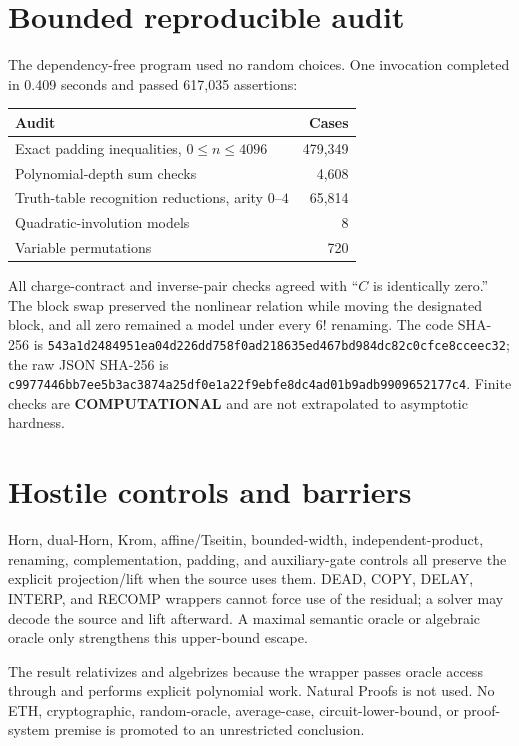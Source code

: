 \documentclass[11pt]{article}
\newcommand{\COMP}{\textbf{COMPUTATIONAL}}
\begin{document}
\section{Bounded reproducible audit}
The dependency-free program
 used no random
choices.  One invocation completed in 0.409 seconds and passed 617,035
assertions:
\begin{center}
\begin{tabular}{lr}
\toprule
Audit & Cases \\
\midrule
Exact padding inequalities, $0\le n\le4096$ & 479,349 \\
Polynomial-depth sum checks & 4,608 \\
Truth-table recognition reductions, arity $0$--$4$ & 65,814 \\
Quadratic-involution models & 8 \\
Variable permutations & 720 \\
\bottomrule
\end{tabular}
\end{center}
All charge-contract and inverse-pair checks agreed with ``$C$ is identically
zero.''  The block swap preserved the nonlinear relation while moving the
designated block, and all zero remained a model under every $6!$ renaming.
The code SHA-256 is
\texttt{543a1d2484951ea04d226dd758f0ad218635ed467bd984dc82c0cfce8cceec32};
the raw JSON SHA-256 is
\texttt{c9977446bb7ee5b3ac3874a25df0e1a22f9ebfe8dc4ad01b9adb9909652177c4}.
Finite checks are \COMP{} and are not extrapolated to asymptotic hardness.

\section{Hostile controls and barriers}
Horn, dual-Horn, Krom, affine/Tseitin, bounded-width, independent-product,
renaming, complementation, padding, and auxiliary-gate controls all preserve
the explicit projection/lift when the source uses them.  DEAD, COPY, DELAY,
INTERP, and RECOMP wrappers cannot force use of the residual; a solver may
decode the source and lift afterward.  A maximal semantic oracle or algebraic
oracle only strengthens this upper-bound escape.

The result relativizes and algebrizes because the wrapper passes oracle access
through and performs explicit polynomial work.  Natural Proofs is not used.
No ETH, cryptographic, random-oracle, average-case, circuit-lower-bound, or
proof-system premise is promoted to an unrestricted conclusion.
\end{document}

